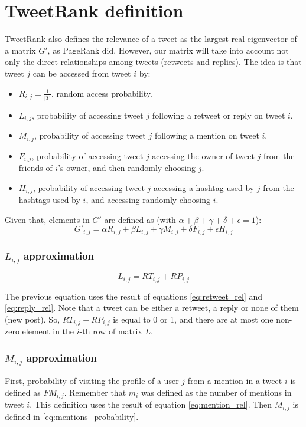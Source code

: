 \section{TweetRank definition}\label{sec:tweetrank_definition}
TweetRank also defines the relevance of a tweet as the largest real eigenvector of a matrix $G'$, as PageRank did. However, our matrix will take into account not only the direct relationships among tweets (retweets and replies). The idea is that tweet $j$ can be accessed from tweet $i$ by:  
\begin{itemize}
\item $R_{i,j} = \frac{1}{|T|}$, random access probability.
\item $L_{i,j}$, probability of accessing tweet $j$ following a retweet or reply on tweet $i$.
\item $M_{i,j}$, probability of accessing tweet $j$ following a mention on tweet $i$.
\item $F_{i,j}$, probability of accessing tweet $j$ accessing the owner of tweet $j$ from the friends of $i$'s owner, and then randomly choosing $j$.
\item $H_{i,j}$, probability of accessing tweet $j$ accessing a hashtag used by $j$ from the hashtags used by $i$, and accessing randomly choosing $i$.
\end{itemize}

Given that, elements in $G'$ are defined as (with $\alpha + \beta + \gamma + \delta + \epsilon = 1$):
\begin{equation}\label{eq:tweetrank}
G'_{i,j} = \alpha R_{i,j} + \beta L_{i,j} + \gamma M_{i,j} + \delta F_{i,j} + \epsilon H_{i,j}
\end{equation}

\subsubsection*{$L_{i,j}$ approximation}
\begin{equation}\label{eq:ref_prob}
L_{i,j} = RT_{i,j} + RP_{i,j}
\end{equation}

The previous equation uses the result of equations \ref{eq:retweet_rel} and \ref{eq:reply_rel}. Note that a tweet can be either a retweet, a reply or none of them (new post). So, $RT_{i,j} + RP_{i,j}$ is equal to 0 or 1, and there are at most one non-zero element in the $i$-th row of matrix $L$.

\subsubsection*{$M_{i,j}$ approximation}
First, probability of visiting the profile of a user $j$ from a mention in a tweet $i$ is defined as $FM_{i,j}$. Remember that $m_i$ was defined as the number of mentions in tweet $i$. This definition uses the result of equation \ref{eq:mention_rel}. Then $M_{i,j}$ is defined in \ref{eq:mentions_probability}.

